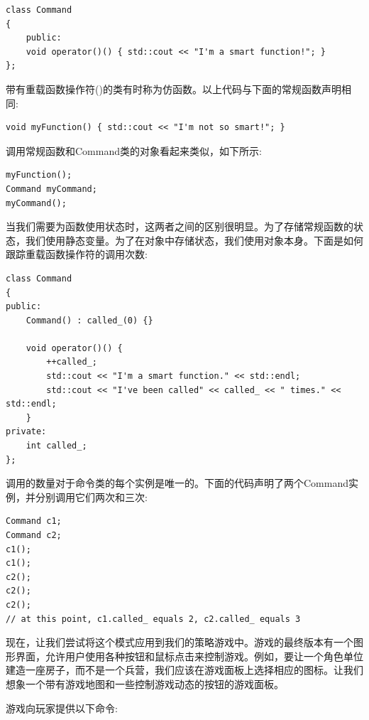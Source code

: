 \begin{lstlisting}[caption={}]
class Command
{
	public:
	void operator()() { std::cout << "I'm a smart function!"; }
};
\end{lstlisting}

带有重载函数操作符()的类有时称为仿函数。以上代码与下面的常规函数声明相同: \par

\begin{lstlisting}[caption={}]
void myFunction() { std::cout << "I'm not so smart!"; }
\end{lstlisting}

调用常规函数和Command类的对象看起来类似，如下所示: \par

\begin{lstlisting}[caption={}]
myFunction();
Command myCommand;
myCommand();
\end{lstlisting}

当我们需要为函数使用状态时，这两者之间的区别很明显。为了存储常规函数的状态，我们使用静态变量。为了在对象中存储状态，我们使用对象本身。下面是如何跟踪重载函数操作符的调用次数: \par

\begin{lstlisting}[caption={}]
class Command
{
public:
	Command() : called_(0) {}
	
	void operator()() {
		++called_;
		std::cout << "I'm a smart function." << std::endl;
		std::cout << "I've been called" << called_ << " times." << std::endl;
	}
private:
	int called_;
};
\end{lstlisting}

调用的数量对于命令类的每个实例是唯一的。下面的代码声明了两个Command实例，并分别调用它们两次和三次: \par

\begin{lstlisting}[caption={}]
Command c1;
Command c2;
c1();
c1();
c2();
c2();
c2();
// at this point, c1.called_ equals 2, c2.called_ equals 3
\end{lstlisting}

现在，让我们尝试将这个模式应用到我们的策略游戏中。游戏的最终版本有一个图形界面，允许用户使用各种按钮和鼠标点击来控制游戏。例如，要让一个角色单位建造一座房子，而不是一个兵营，我们应该在游戏面板上选择相应的图标。让我们想象一个带有游戏地图和一些控制游戏动态的按钮的游戏面板。 \par
游戏向玩家提供以下命令: \par

